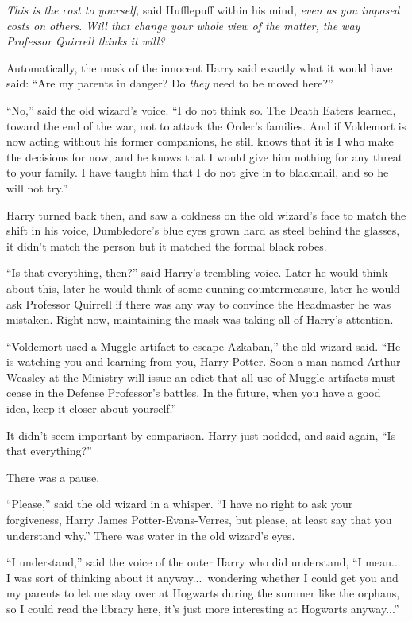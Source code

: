 \emph{This is the cost to yourself,} said Hufflepuff within his mind, \emph{even as you imposed costs on others. Will that change your whole view of the matter, the way Professor Quirrell thinks it will?}

Automatically, the mask of the innocent Harry said exactly what it would have said: “Are my parents in danger? Do \emph{they} need to be moved here?”

“No,” said the old wizard’s voice. “I do not think so. The Death Eaters learned, toward the end of the war, not to attack the Order’s families. And if Voldemort is now acting without his former companions, he still knows that it is I who make the decisions for now, and he knows that I would give him nothing for any threat to your family. I have taught him that I do not give in to blackmail, and so he will not try.”

Harry turned back then, and saw a coldness on the old wizard’s face to match the shift in his voice, Dumbledore’s blue eyes grown hard as steel behind the glasses, it didn’t match the person but it matched the formal black robes.

“Is that everything, then?” said Harry’s trembling voice. Later he would think about this, later he would think of some cunning countermeasure, later he would ask Professor Quirrell if there was any way to convince the Headmaster he was mistaken. Right now, maintaining the mask was taking all of Harry’s attention.

“Voldemort used a Muggle artifact to escape Azkaban,” the old wizard said. “He is watching you and learning from you, Harry Potter. Soon a man named Arthur Weasley at the Ministry will issue an edict that all use of Muggle artifacts must cease in the Defense Professor’s battles. In the future, when you have a good idea, keep it closer about yourself.”

It didn’t seem important by comparison. Harry just nodded, and said again, “Is that everything?”

There was a pause.

“Please,” said the old wizard in a whisper. “I have no right to ask your forgiveness, Harry James Potter-Evans-Verres, but please, at least say that you understand why.” There was water in the old wizard’s eyes.

“I understand,” said the voice of the outer Harry who did understand, “I mean... I was sort of thinking about it anyway...\ wondering whether I could get you and my parents to let me stay over at Hogwarts during the summer like the orphans, so I could read the library here, it’s just more interesting at Hogwarts anyway...”

